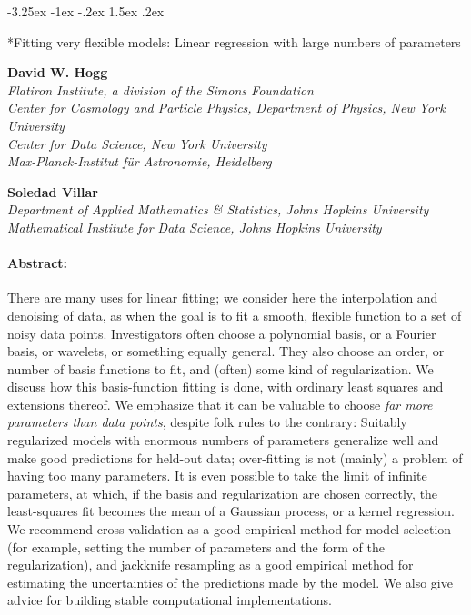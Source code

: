 \documentclass[12pt,letterpaper]{article}
\makeatletter
\renewcommand\section{\@startsection {section}{1}{\z@}%
  {-3.25ex \@plus -1ex \@minus -.2ex}%
  {1.5ex \@plus .2ex}%
  {\raggedright\normalfont\large\bfseries}}
\makeatother
\begin{document}
\thispagestyle{plain}

\section*{Fitting very flexible models: Linear regression with large numbers of parameters}

\noindent
\textbf{David W. Hogg} \\%
\textsl{\footnotesize Flatiron Institute, a division of the Simons Foundation \\
Center for Cosmology and Particle Physics, Department of Physics, New York University \\
Center for Data Science, New York University \\
Max-Planck-Institut f\"ur Astronomie, Heidelberg}

\medskip
\noindent
\textbf{Soledad Villar} \\
\textsl{\footnotesize Department of Applied Mathematics \& Statistics, Johns Hopkins University \\
Mathematical Institute for Data Science, Johns Hopkins University}

\paragraph{Abstract:}
There are many uses for linear fitting; we consider here the interpolation and denoising of data, as when the goal is to fit a smooth, flexible function to a set of noisy data points.
Investigators often choose a polynomial basis, or a Fourier basis, or wavelets, or something equally general.
They also choose an order, or number of basis functions to fit, and (often) some kind of regularization.
We discuss how this basis-function fitting is done, with ordinary least squares and extensions thereof.
We emphasize that it can be valuable to choose \emph{far more parameters than data points}, despite folk rules to the contrary:
Suitably regularized models with enormous numbers of parameters generalize well and make good predictions for held-out data; over-fitting is not (mainly) a problem of having too many parameters.
It is even possible to take the limit of infinite parameters, at which, if the basis and regularization are chosen correctly, the least-squares fit becomes the mean of a Gaussian process, or a kernel regression.
We recommend cross-validation as a good empirical method for model selection (for example, setting the number of parameters and the form of the regularization),
and jackknife resampling as a good empirical method for estimating the uncertainties of the predictions made by the model.
We also give advice for building stable computational implementations.
\end{document}
